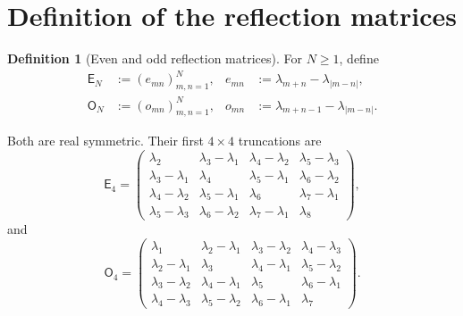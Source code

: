 \documentclass[11pt]{amsart}
\numberwithin{equation}{section}
\theoremstyle{plain}
\theoremstyle{definition}
\newtheorem{definition}[theorem]{Definition}
\theoremstyle{remark}
\newcommand{\E}{\mathsf E}
\newcommand{\Omat}{\mathsf O}
\begin{document}
\section{Definition of the reflection matrices}
\label{sec:definitions}

\begin{definition}[Even and odd reflection matrices]
\label{def:reflection_matrices}
For $N\ge1$, define
\begin{align}
\E_N
&:=\left(e_{mn}\right)_{m,n=1}^N,
&
e_{mn}&:=\lambda_{m+n}-\lambda_{|m-n|},
\label{eq:E_definition}\\
\Omat_N
&:=\left(o_{mn}\right)_{m,n=1}^N,
&
o_{mn}&:=\lambda_{m+n-1}-\lambda_{|m-n|}.
\label{eq:O_definition}
\end{align}
\end{definition}

Both are real symmetric. Their first $4\times4$ truncations are
\begin{equation}
\E_4=
\begin{pmatrix}
\lambda_2&\lambda_3-\lambda_1&\lambda_4-\lambda_2&\lambda_5-\lambda_3\\
\lambda_3-\lambda_1&\lambda_4&\lambda_5-\lambda_1&\lambda_6-\lambda_2\\
\lambda_4-\lambda_2&\lambda_5-\lambda_1&\lambda_6&\lambda_7-\lambda_1\\
\lambda_5-\lambda_3&\lambda_6-\lambda_2&\lambda_7-\lambda_1&\lambda_8
\end{pmatrix},
\label{eq:E4}
\end{equation}
and
\begin{equation}
\Omat_4=
\begin{pmatrix}
\lambda_1&\lambda_2-\lambda_1&\lambda_3-\lambda_2&\lambda_4-\lambda_3\\
\lambda_2-\lambda_1&\lambda_3&\lambda_4-\lambda_1&\lambda_5-\lambda_2\\
\lambda_3-\lambda_2&\lambda_4-\lambda_1&\lambda_5&\lambda_6-\lambda_1\\
\lambda_4-\lambda_3&\lambda_5-\lambda_2&\lambda_6-\lambda_1&\lambda_7
\end{pmatrix}.
\label{eq:O4}
\end{equation}
\end{document}
